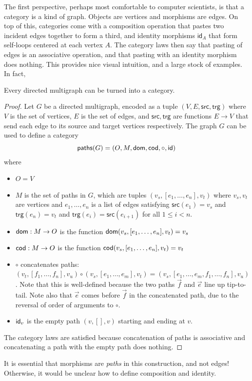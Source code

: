 The first perspective, perhaps most
comfortable to computer scientists, is that a category is a kind of graph.
Objects are vertices and morphisms are edges.
On top of this, categories come with a
composition operation that pastes two incident edges together to form a third,
and identity morphisms \(\mathsf{id}_A\) that form self-loops centered at each vertex \(A\).
The category laws then say that pasting of edges is an associative operation,
and that pasting with an identity morphism does nothing.
This provides nice visual intuition, and a large stock of examples.
In fact,
\begin{construction}
  Every directed multigraph can be turned into a category.
\end{construction}
\begin{proof}
  Let \(G\) be a directed multigraph,
  encoded as a tuple \((V,E,\mathsf{src},\mathsf{trg})\)
  where \(V\) is the set of vertices, \(E\) is the set of edges,
  and \(\mathsf{src},\mathsf{trg}\) are functions \(E\to V\)
  that send each edge to its source and target vertices respectively.
  The graph \(G\) can be used to define a category
  \[
  \mathsf{paths}(G) = (O,M,\operatorname{\mathsf{dom}},\operatorname{\mathsf{cod}},\circ,\mathsf{id})
  \]
  where
  \begin{itemize}
  \item \(O = V\)
  \item \(M\) is the set of paths in \(G\),
    which are tuples \((v_s,[e_1,\dots,e_n],v_t)\)
    where \(v_s,v_t\) are vertices and \(e_1,\dots,e_n\) is a list of edges satisfying
    \(\mathsf{src}(e_1) = v_s\) and \(\mathsf{trg}(e_n) = v_t\)
    and \(\mathsf{trg}(e_i) = \mathsf{src}(e_{i+1})\)
    for all \(1\le i < n\).
  \item \(\operatorname{\mathsf{dom}} : M \to O\) is the function \(\operatorname{\mathsf{dom}}(v_s,[e_1,\dots,e_n],v_t) = v_s\)
  \item \(\operatorname{\mathsf{cod}} : M \to O\) is the function \(\operatorname{\mathsf{cod}}(v_s,[e_1,\dots,e_n],v_t) = v_t\)
  \item \(\circ\) concatenates paths:
    \((v_t,[f_1,\dots,f_n],v_u)\circ(v_s,[e_1,\dots,e_m],v_t) = (v_s,[e_1,\dots,e_m,f_1,\dots,f_n],v_u)\).
    Note that this is well-defined because the two paths \(\vec f\) and \(\vec e\) line up tip-to-tail.
    Note also that \(\vec e\) comes before \(\vec f\) in the concatenated path, due to the reversal of order
    of arguments to \(\circ\).
  \item \(\mathsf{id}_v\) is the empty path \((v,[],v)\) starting and ending at \(v\).
  \end{itemize}
  The category laws are satisfied because concatenation of paths is associative and concatenating a path with the
  empty path does nothing.
\end{proof}
\begin{note}
  It is essential that morphisms are \emph{paths} in this construction, and not edges!
  Otherwise, it would be unclear how to define composition and identity.
\end{note}


